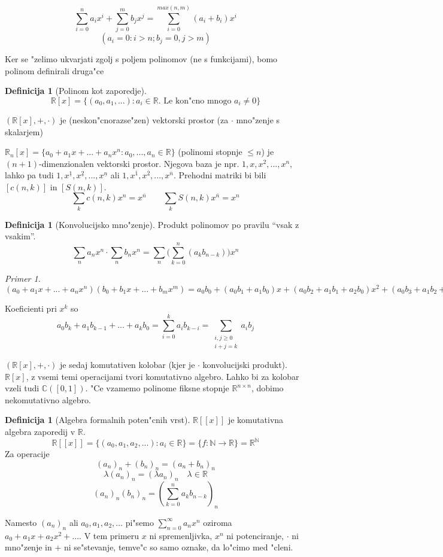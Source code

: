 \documentclass[a4paper,12pt]{article}
\theoremstyle{definition}
\newtheorem{defn}[counter]{Definicija}
\theoremstyle{remark}
\newtheorem*{ex}{Primer}
\newcommand{\N}{\mathbb{N}}
\newcommand{\R}{\mathbb{R}}
\newcommand{\C}{\mathbb{C}}
\begin{document}
\[\sum_{i = 0}^n a_i x^{i} + \sum_{j = 0}^m b_j x^j = \sum_{i = 0}^{max(n, m)}(a_i + b_i)x^{i}\]
\[(a_i = 0: i > n; b_j = 0, j > m)\]

Ker se "zelimo ukvarjati zgolj s poljem polinomov (ne s funkcijami), bomo polinom definirali druga"ce
\begin{defn}[Polinom kot zaporedje]
	\[\R[x] = \{(a_0, a_1, ...): a_i \in \R. \text{ Le kon"cno mnogo }a_i \neq 0\}\]
\end{defn}

$(\R[x], +, \cdot)$ je (neskon"cnorazse"zen) vektorski prostor (za $\cdot$ mno"zenje s skalarjem)

$\R_n[x] = \{a_0 + a_1 x + ... + a_n x^n: a_0, ..., a_n \in \R\}$ (polinomi stopnje $\leqslant n$) je $(n + 1)$-dimenzionalen vektorski prostor. Njegova baza je npr. $1, x, x^2, ..., x^n$, lahko pa tudi $1, x^{\underline{1}}, x^{\underline{2}}, ..., x^{\underline{n}}$ ali $1, x^{\overline{1}}, x^{\overline{2}}, ..., x^{\overline{n}}$. Prehodni matriki bi bili $[c(n, k)]$ in $[S(n, k)]$.
\[
	\sum_k c(n, k) x^n = x^{\overline{n}}
	\qquad
	\sum_k S(n, k) x^{\overline{n}} = x^n
\]

\begin{defn}[Konvolucijsko mno"zenje]
	Produkt polinomov po pravilu ``vsak z vsakim''.
	\[\sum_na_nx^n \cdot \sum_nb_nx^n = \sum_n\big(\sum_{k=0}^n(a_kb_{n-k})\big)x^n\]
\end{defn}
\begin{ex}
	$(a_0 + a_1 x + ... + a_n x^n)(b_0 + b_1 x + ... + b_m x^m) = a_0 b_0 + (a_0 b_1 + a_1 b_0)x + (a_0 b_2 + a_1 b_ 1 + a_2 b_0) x^2 + (a_0 b_3 + a_1 b_2 + a_2 b_1 + a_3 b_0)x^3 + ... + a_n b_m x^{n + m}$
\end{ex}
Koeficienti pri $x^k$ so
\[a_0 b_k + a_1 b_{k - 1} + ... + a_k b_0 = \sum_{i = 0}^k a_i b_{k - i} = \sum_{\substack{i, j \geqslant 0 \\ i + j = k}} a_i b_j\]

$(\R[x], +, \cdot)$ je sedaj komutativen kolobar (kjer je $\cdot$ konvolucijski produkt). $\R[x]$, z vsemi temi operacijami tvori komutativno algebro. Lahko bi za kolobar vzeli tudi $\C([0, 1])$. "Ce vzamemo polinome fiksne stopnje $\R^{n \times n}$, dobimo nekomutativno algebro.

\begin{defn}[Algebra formalnih poten"cnih vrst]
    $\R[[x]]$ je komutativna algebra zaporedij v $\R$.
    \[\R[[x]] = \{(a_0, a_1, a_2, ...): a_i \in \R\} = \{f: \N \rightarrow \R\} = \R^{\N}\]
	Za operacije
    \[(a_n)_n + (b_n)_n = (a_n + b_n)_n\]
    \[\lambda(a_n)_n = (\lambda a_n)_n \quad \lambda \in \R \]
    \[(a_n)_n (b_n)_n = (\sum_{k = 0}^n a_k b_{n - k})_n\]
\end{defn}
Namesto $(a_n)_n$ ali $a_0, a_1, a_2, \ldots$ pi"semo $\sum_{n = 0}^{\infty} a_n x^n$ oziroma $a_0 + a_1 x + a_2 x^2 + ...$. V tem primeru $x$ ni spremenljivka, $x^n$ ni potenciranje, $\cdot$ ni mno"zenje in $+$ ni se"stevanje, temve"c so samo oznake, da lo"cimo med "cleni.
\end{document}
